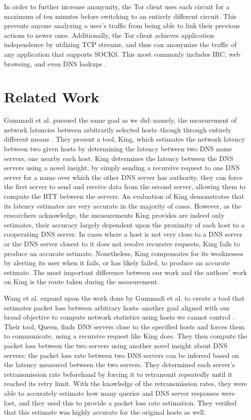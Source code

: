 \documentclass[twocolumn,11pt]{article}
\begin{document}
In order to further increase anonymity, the Tor client uses each circuit for a maximum of ten minutes before switching to an entirely different circuit. This prevents anyone analyzing a user's traffic from being able to link their previous actions to newer ones. Additionally, the Tor client achieves application independence by utilizing TCP streams, and thus can anonymize the traffic of any application that supports SOCKS. This most commonly includes IRC, web browsing, and even DNS lookups \cite{tor_about}. 


\section{Related Work}

Gummadi et al. pursued the same goal as we did--namely, the measurement of network latencies between arbitrarily selected hosts--though through entirely different means  \cite{Gummadi}. They present a tool, King, which estimates the network latency between two given hosts by determining the latency between two DNS name servers, one nearby each host. King determines the latency between the DNS servers using a novel insight: by simply sending a recursive request to one DNS server for a name over which the other DNS server has authority, they can force the first server to send and receive data from the second server, allowing them to compute the RTT between the servers. An evaluation of King demonstrates that its latency estimates are very accurate in the majority of cases. However, as the researchers acknowledge, the measurements King provides are indeed only estimates, their accuracy largely dependent upon the proximity of each host to a cooperating DNS server. In cases where a host is not very close to a DNS server or the DNS server closest to it does not resolve recursive requests, King fails to produce an accurate estimate. Nonetheless, King compensates for its weaknesses by alerting its user when it fails, or has likely failed, to produce an accurate estimate. The most important difference between our work and the authors' work on King is the route taken during the measurement.

Wang et al. expand upon the work done by Gummadi et al. to create a tool that estimates packet loss between arbitrary hosts--another goal aligned with our broad objective to compute network statistics using hosts we cannot control \cite{Wang}. Their tool, Queen, finds DNS servers close to the specified hosts and forces them to communicate, using a recursive request like King does. They then compute the packet loss between the two servers using another novel insight about DNS servers: the packet loss rate between two DNS servers can be inferred based on the latency measured between the two servers. They determined each server's retransmission rate beforehand by forcing it to retransmit repeatedly until it reached its retry limit. With the knowledge of the retransmission rates, they were able to accurately estimate how many queries and DNS server responses were lost, and they used this to provide a packet loss rate estimation. They verified that this estimate was highly accurate for the original hosts as well.
\end{document}
